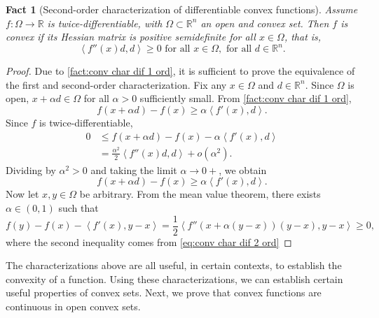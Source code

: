\documentclass[smallextended,numbook,nospthms]{svjour3}
\theoremstyle{plain}
\newtheorem{fact}[theorem]{Fact}
\theoremstyle{definition}
\def\RR{\mathds R}
\newcommand{\scal}[2]{\left\langle{#1},{#2}  \right\rangle}
\begin{document}
\begin{fact}[Second-order characterization of differentiable convex functions]\label{fact:conv char dif 2 ord}
	Assume $f:\Omega \rightarrow \RR$ is twice-differentiable, with $\Omega \subset \RR^n$ an open and convex set. Then $f$ is convex if its Hessian matrix is positive semidefinite for all $x \in \Omega$, that is,
	$$
	\scal{f''(x)d}{d}\geq 0 \text{ for all } x \in \Omega, \text{ for all } d \in \RR^n. \label{eq:conv char dif 2 ord}
	$$
\end{fact}
\begin{proof}
Due to \cref{fact:conv char dif 1 ord}, it is sufficient to prove the equivalence of the first and second-order characterization.
Fix any $x \in \Omega$ and $d \in \RR^n$. Since $\Omega$ is open, $x+\alpha d \in \Omega$ for all $\alpha > 0$ sufficiently small. From \cref{fact:conv char dif 1 ord},
\[
f(x+\alpha d)-f(x) \geq \alpha \scal{f'(x)}{d}.
\]
Since $f$ is twice-differentiable, 
\begin{align}
	0 &\leq f(x+\alpha d)-f(x)-\alpha \scal{f'(x)}{d} \\
		&= \frac{\alpha^2}{2}\scal{f''(x)d}{d}+o(\alpha^2).
\end{align}
Dividing by $\alpha^2>0$ and taking the limit $\alpha \rightarrow 0+$, we obtain
\[
f(x+\alpha d)-f(x) \geq \alpha \scal{f'(x)}{d}.
\]
Now let $x,y \in \Omega$ be arbitrary. From the mean value theorem, there exists $\alpha \in (0,1)$ such that
\[
f(y)-f(x)-\scal{f'(x)}{y-x}=\frac{1}{2}\scal{f''(x+\alpha(y-x))(y-x)}{y-x} \geq 0,
\]
where the second inequality comes from \cref{eq:conv char dif 2 ord}
\end{proof}

The characterizations above are all useful, in certain contexts, to establish the convexity of a function. Using these characterizations, we can establish certain useful properties of convex sets. Next, we prove that convex functions are continuous in open convex sets.
\end{document}
